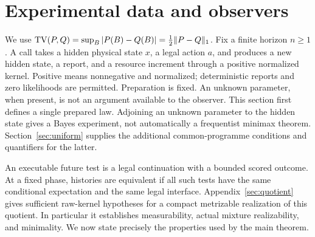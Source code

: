 \section{Experimental data and observers}\label{sec:experiment}
We use $\operatorname{TV}(P,Q)=\sup_B|P(B)-Q(B)|=\frac12\|P-Q\|_1$. Fix a finite horizon $n\ge1$. A call takes a hidden physical state $x$, a legal action $a$, and produces a new hidden state, a report, and a resource increment through a positive normalized kernel. Positive means nonnegative and normalized; deterministic reports and zero likelihoods are permitted. Preparation is fixed. An unknown parameter, when present, is not an argument available to the observer. This section first defines a single prepared law. Adjoining an unknown parameter to the hidden state gives a Bayes experiment, not automatically a frequentist minimax theorem. Section~\ref{sec:uniform} supplies the additional common-programme conditions and quantifiers for the latter.

An executable future test is a legal continuation with a bounded scored outcome. At a fixed phase, histories are equivalent if all such tests have the same conditional expectation and the same legal interface. Appendix~\ref{sec:quotient} gives sufficient raw-kernel hypotheses for a compact metrizable realization of this quotient. In particular it establishes measurability, actual mixture realizability, and minimality. We now state precisely the properties used by the main theorem.

